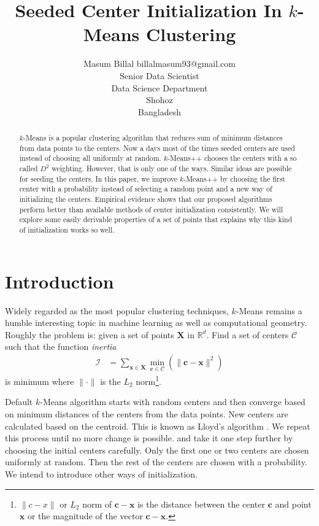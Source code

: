\documentclass[twoside, 11pt]{article}
\title{Seeded Center Initialization In $k$-Means Clustering}
\author{\name Masum Billal \email billalmasum93@gmail.com \\
	Senior Data Scientist\\
	\addr Data Science Department\\
	Shohoz\\
	Bangladesh}
\newcommand{\x}{\mathbf{x}}
\newcommand{\X}{\mathbf{X}}
\renewcommand{\c}{\mathbf{c}}
\newcommand{\C}{\mathcal{C}}
\begin{document}
	
	\maketitle
		\begin{abstract}%
			$k$-Means is a popular clustering algorithm that reduces sum of minimum distances from data points to the centers. Now a days most of the times seeded centers are used instead of choosing all uniformly at random. $k$-Means++ chooses the centers with a so called $D^2$ weighting. However, that is only one of the ways. Similar ideas are possible for seeding the centers. In this paper, we improve $k$-Means++ by choosing the first center with a probability instead of selecting a random point and a new way of initializing the centers. Empirical evidence shows that our proposed algorithms perform better than available methods of center initialization consistently. We will explore some easily derivable properties of a set of points that explains why this kind of initialization works so well.
		\end{abstract}
	\section{Introduction}
	Widely regarded as the most popular clustering techniques, $k$-Means remains a humble interesting topic in machine learning as well as computational geometry. Roughly the problem is: given a set of points $\X$ in $\mathbb{R}^d$. Find a set of centers $\mathcal{C}$ such that the function \textit{inertia}
		\begin{align*}
			\mathcal{I} & = \sum_{\x\in\X}\min_{\c\in\C}(\|\c-\x\|^2)
		\end{align*}
	is minimum where $\|\cdot\|$ is the $L_2$ norm\footnote{$\|c-x\|$ or $L_2$ norm of $\c-\x$ is the distance between the center $\c$ and point $\x$ or the magnitude of the vector $\c-\x$.}.
	
	Default $k$-Means algorithm starts with random centers and then converge based on minimum distances of the centers from the data points. New centers are calculated based on the centroid. This is known as Lloyd's algorithm \citep{lloyd}. We repeat this process until no more change is possible. \cite{ostrovsky} and \cite{kmeans++} take it one step further by choosing the initial centers carefully. Only the first one or two centers are chosen uniformly at random. Then the rest of the centers are chosen with a probability. We intend to introduce other ways of initialization.
\end{document}
